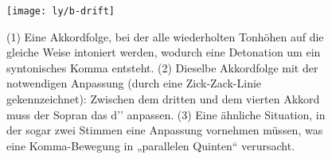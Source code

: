 \begin{figure}
  \centering
  \texttt{[image: ly/b-drift]}
  \caption{(1) Eine Akkordfolge, bei der alle wiederholten Tonhöhen auf die   
  	gleiche Weise intoniert werden, wodurch eine Detonation um ein syntonisches
  	Komma entsteht. %
  	(2) Dieselbe Akkordfolge mit der notwendigen Anpassung (durch eine
  	Zick-Zack-Linie gekennzeichnet): Zwischen dem dritten und dem vierten Akkord
  	muss der Sopran das d’’ anpassen. %
  	(3) Eine ähnliche Situation, in der sogar zwei Stimmen eine Anpassung
  	vornehmen müssen, was eine Komma-Bewegung in „parallelen Quinten“
  	verursacht.}\label{fig:drift}
\end{figure}

